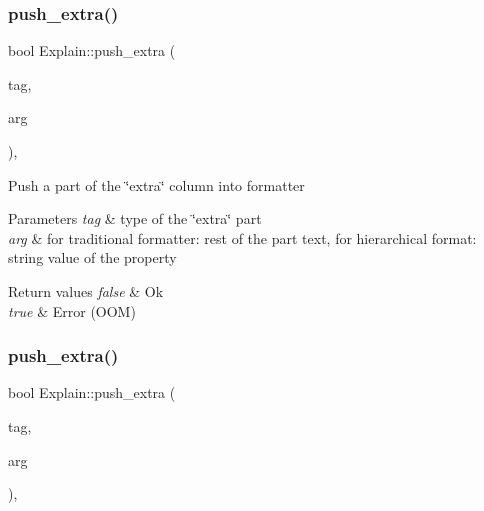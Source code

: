 \subsubsection{\texorpdfstring{push\+\_\+extra()}{push\_extra()}\hspace{0.1cm}{\footnotesize\ttfamily [2/3]}}
{\footnotesize\ttfamily bool Explain\+::push\+\_\+extra (\begin{DoxyParamCaption}\item[{Extra\+\_\+tag}]{tag,  }\item[{const String \&}]{arg }\end{DoxyParamCaption})\hspace{0.3cm}{\ttfamily [inline]}, {\ttfamily [protected]}}

Push a part of the \char`\"{}extra\char`\"{} column into formatter


\begin{DoxyParams}{Parameters}
{\em tag} & type of the \char`\"{}extra\char`\"{} part \\
\hline
{\em arg} & for traditional formatter\+: rest of the part text, for hierarchical format\+: string value of the property\\
\hline
\end{DoxyParams}

\begin{DoxyRetVals}{Return values}
{\em false} & Ok \\
\hline
{\em true} & Error (O\+OM) \\
\hline
\end{DoxyRetVals}
\mbox{\label{classExplain_ab163b209b693ae6da003f8b3fbcb0e3d}} 
\subsubsection{\texorpdfstring{push\+\_\+extra()}{push\_extra()}\hspace{0.1cm}{\footnotesize\ttfamily [3/3]}}
{\footnotesize\ttfamily bool Explain\+::push\+\_\+extra (\begin{DoxyParamCaption}\item[{Extra\+\_\+tag}]{tag,  }\item[{const char $\ast$}]{arg }\end{DoxyParamCaption})\hspace{0.3cm}{\ttfamily [inline]}, {\ttfamily [protected]}}

